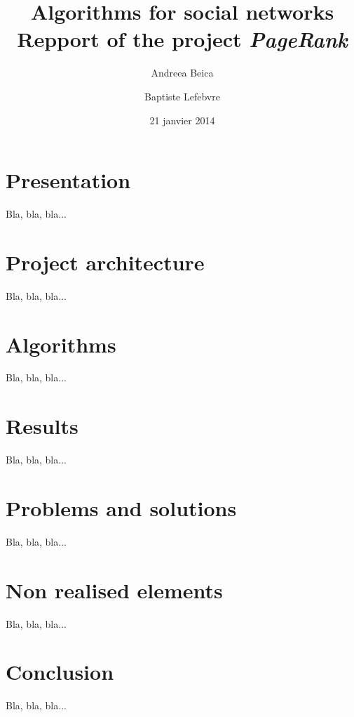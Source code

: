 \documentclass[pdftex,12pt,a4paper]{article}
\begin{document}
\title{
	\Large \textbf{Algorithms for social networks} \\
	\textsf{Repport of the project \emph{PageRank}}
}
\author{Andreea Beica \and Baptiste Lefebvre}
\date{21 janvier 2014}

\maketitle


\section{Presentation}

Bla, bla, bla...


\section{Project architecture}

Bla, bla, bla...


\section{Algorithms}

Bla, bla, bla...


\section{Results}

Bla, bla, bla...


\section{Problems and solutions}

Bla, bla, bla...


\section{Non realised elements}

Bla, bla, bla...


\section{Conclusion}

Bla, bla, bla...
\end{document}
